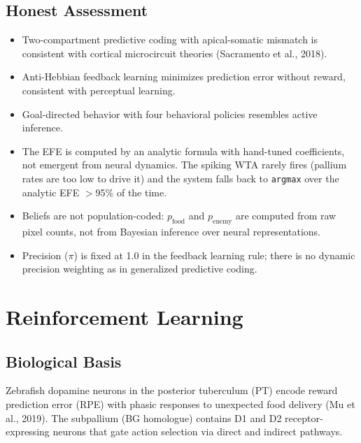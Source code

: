 \documentclass[11pt,a4paper]{article}
\begin{document}
\subsection{Honest Assessment}

\begin{itemize}[leftmargin=*]
\item[\textcolor{realistic}{$\checkmark$}] Two-compartment predictive coding with
  apical-somatic mismatch is consistent with cortical microcircuit theories
  (Sacramento et al., 2018).
\item[\textcolor{realistic}{$\checkmark$}] Anti-Hebbian feedback learning minimizes
  prediction error without reward, consistent with perceptual learning.
\item[\textcolor{realistic}{$\checkmark$}] Goal-directed behavior with four behavioral
  policies resembles active inference.
\item[\textcolor{missing}{$\times$}] The EFE is computed by an analytic formula with
  hand-tuned coefficients, not emergent from neural dynamics.  The spiking WTA
  rarely fires (pallium rates are too low to drive it) and the system falls back to
  \texttt{argmax} over the analytic EFE $>$95\% of the time.
\item[\textcolor{missing}{$\times$}] Beliefs are not population-coded: $p_\text{food}$
  and $p_\text{enemy}$ are computed from raw pixel counts, not from Bayesian
  inference over neural representations.
\item[\textcolor{missing}{$\times$}] Precision ($\pi$) is fixed at 1.0 in the
  feedback learning rule; there is no dynamic precision weighting as in
  generalized predictive coding.
\end{itemize}

\section{Reinforcement Learning}
\label{sec:rl}

\subsection{Biological Basis}

Zebrafish dopamine neurons in the posterior tuberculum (PT) encode reward prediction
error (RPE) with phasic responses to unexpected food delivery (Mu et al., 2019).
The subpallium (BG homologue) contains D1 and D2 receptor-expressing neurons
that gate action selection via direct and indirect pathways.
\end{document}
